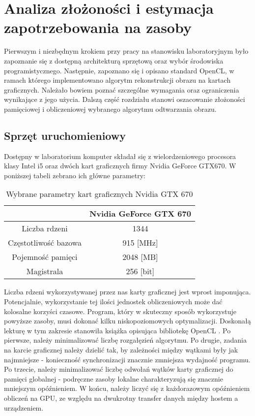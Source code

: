\section{Analiza złożoności i estymacja zapotrzebowania na zasoby}
Pierwszym i niezbędnym krokiem przy pracy na stanowisku laboratoryjnym było zapoznanie się z dostępną architekturą sprzętową oraz wybór środowiska programistycznego. Następnie, zapoznano się i opisano standard OpenCL, w ramach którego implementowano algorytm rekonstrukcji obrazu na kartach graficznych. Należało bowiem poznać szczególne wymagania oraz ograniczenia wynikające z jego użycia. Dalszą część rozdziału stanowi oszacowanie złożoności pamięciowej i obliczeniowej wybranego algorytmu odtwarzania obrazu.
\subsection{Sprzęt uruchomieniowy}
Dostępny w laboratorium komputer składał się z wielordzeniowego procesora klasy Intel i5 oraz dwóch kart graficznych firmy Nvidia GeForce GTX670. W poniższej tabeli zebrano ich główne parametry:

\begin{table}[H]
\begin{center}
\begin{tabular}{|c|c|}
\hline
         & Nvidia GeForce GTX 670  \\
\hline
        Liczba rdzeni & 1344 \\
\hline
        Częstotliwość bazowa & 915 [MHz] \\
\hline
        Pojemność pamięci & 2048 [MB] \\
\hline
        Magistrala & 256 [bit] \\
\hline
\end{tabular} 
\caption{Wybrane parametry kart graficznych Nvidia GTX 670}
\label{tab:PGU}
\end{center}
\end{table}

Liczba rdzeni wykorzystywanej przez nas karty graficznej jest wprost imponująca. Potencjalnie, wykorzystanie tej ilości jednostek obliczeniowych może dać kolosalne korzyści czasowe. Program, który w skuteczny sposób wykorzystuje powyższe zasoby, musi dokonać kilku niskopoziomowych optymalizacji. Doskonałą lekturę w tym zakresie stanowiła książka opisująca bibliotekę OpenCL \cite{Scarpino2012}. Po pierwsze, należy minimalizować liczbę rozgałęzień algorytmu. Po drugie, zadania na karcie graficznej należy dzielić tak, by zależności między wątkami były jak najmniejsze - konieczność synchronizacji znacznie zmniejsza wydajność programu. Po trzecie, należy minimalizować liczbę odwołań wątków karty graficznej do pamięci globalnej - podręczne zasoby lokalne charakteryzują się znacznie mniejszym opóźnieniem. W końcu, należy liczyć się z każdorazowym opóźnieniem obliczeń na GPU, ze względu na dwukrotny transfer danych między hostem a urządzeniem.

